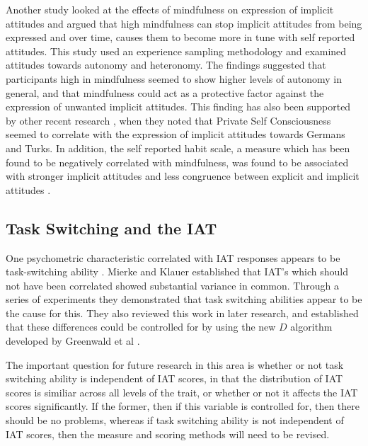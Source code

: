 Another study \cite{Levesque2007} looked at the effects of mindfulness on expression of implicit attitudes and argued that high mindfulness can stop implicit attitudes from being expressed and over time, causes them to become more in tune with self reported attitudes. This study used an experience sampling methodology and examined attitudes towards autonomy and heteronomy. The findings suggested that participants high in mindfulness seemed to show higher levels of autonomy in general, and that mindfulness could act as a protective factor against the expression of unwanted implicit attitudes.  This finding has also been supported by other recent research \cite{Gschwendner2006}, when they noted that Private Self Consciousness seemed to correlate with the expression of implicit attitudes towards Germans and Turks. In addition, the self reported habit scale, a measure which has been found to be negatively correlated with mindfulness, was found to be associated with stronger implicit attitudes and less congruence between explicit and implicit attitudes \cite{Conner2007}. 

\subsection{Task Switching and the IAT}
\label{sec:task-switching-iat}



One psychometric characteristic correlated with IAT responses appears to be task-switching ability \cite{Mierke2003}. Mierke and Klauer established that IAT's which should not have been correlated showed substantial variance in common.  Through a series of experiments they demonstrated that task switching abilities appear to be the cause for this. They also reviewed this work in later research, and established that these differences could be controlled for by using the new $D$ algorithm developed by Greenwald et al \cite{Greenwald2003,Klauer2005}. 

The important question for future research in this area is whether or not task switching ability is independent of IAT scores, in that the distribution of IAT scores is similiar across all levels of the trait, or whether or not it affects the IAT scores significantly. If the former, then if this variable is controlled for, then there should be no problems, whereas if task switching ability is not independent of IAT scores, then the measure and scoring methods will need to be revised.  




